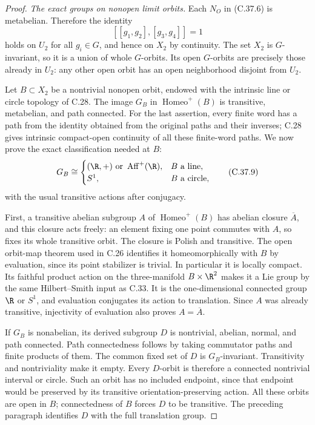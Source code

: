 \begin{proof}
\emph{The exact groups on nonopen limit orbits.}
Each $N_O$ in (C.37.6) is metabelian. Therefore the identity
\[
          [[g_1,g_2],[g_3,g_4]]=1
                                                        \tag{C.37.8}
\]
holds on $U_2$ for all $g_i\in G$, and hence on $X_2$ by
continuity. The set $X_2$ is $G$-invariant, so it is a union
of whole $G$-orbits. Its open $G$-orbits are precisely those
already in $U_2$: any other open orbit has an open
neighborhood disjoint from $U_2$.

Let $B\subset X_2$ be a nontrivial nonopen orbit, endowed
with the intrinsic line or circle topology of C.28.
The image $G_B$ in $\operatorname{Homeo}^+(B)$ is transitive,
metabelian, and path connected. For the last assertion,
every finite word has a path from the identity obtained from
the original paths and their inverses; C.28 gives intrinsic
compact-open continuity of all these finite-word paths.
We now prove the exact classification needed at $B$:
\[
 G_B\cong
 \begin{cases}
   (\R,+)\ \hbox{or }\operatorname{Aff}^+(\R),& B\text{ a line},\\
   S^1,& B\text{ a circle},
 \end{cases}                                            \tag{C.37.9}
\]
with the usual transitive actions after conjugacy.

First, a transitive abelian subgroup $A$ of
$\operatorname{Homeo}^+(B)$ has abelian closure $\overline A$,
and this closure acts freely: an element fixing one point
commutes with $A$, so fixes its whole transitive orbit.
The closure is Polish and transitive. The open orbit-map
theorem used in C.26 identifies it homeomorphically with $B$
by evaluation, since its point stabilizer is trivial.
In particular it is locally compact. Its faithful product
action on the three-manifold $B\times\R^2$ makes it a Lie
group by the same Hilbert--Smith input as C.33.
It is the one-dimensional connected group $\R$ or $S^1$,
and evaluation conjugates its action to translation.
Since $A$ was already transitive, injectivity of evaluation
also proves $A=\overline A$.

If $G_B$ is nonabelian, its derived subgroup $D$ is
nontrivial, abelian, normal, and path connected.
Path connectedness follows by taking commutator paths and
finite products of them. The common fixed set of $D$ is
$G_B$-invariant. Transitivity and nontriviality make it empty.
Every $D$-orbit is therefore a connected nontrivial interval
or circle. Such an orbit has no included endpoint, since
that endpoint would be preserved by its transitive
orientation-preserving action. All these orbits are open in
$B$; connectedness of $B$ forces $D$ to be transitive.
The preceding paragraph identifies $D$ with the full
translation group.


\end{proof}
